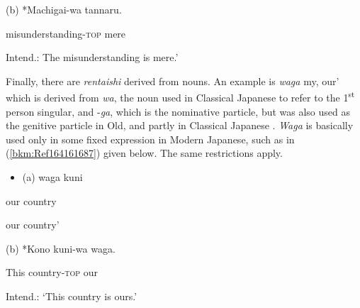 \documentclass[output=paper]{langscibook}
\begin{document}
\begin{styleBeispielCinqueKapitel}
(b) *Machigai-wa tannaru.
\end{styleBeispielCinqueKapitel}

\begin{styleBeispielCinqueKapitel}
misunderstanding-\textsc{top} mere
\end{styleBeispielCinqueKapitel}

\begin{styleBeispielCinqueKapitel}
Intend.: {\textasciigrave}The misunderstanding is mere.’
\end{styleBeispielCinqueKapitel}

Finally, there are \textit{rentaishi} derived from nouns. An example is \textit{waga} {\textasciigrave}my, our’ which is derived from \textit{wa}, the noun used in Classical Japanese to refer to the 1\textsuperscript{st} person singular, and -\textit{ga}, which is the nominative particle, but was also used as the genitive particle in Old, and partly in Classical Japanese \citep{Frellesvig2010}. \textit{Waga} is basically used only in some fixed expression in Modern Japanese, such as in (\ref{bkm:Ref164161687}) given below. The same restrictions apply.

\begin{itemize}
\item \begin{styleBeispielCinqueKapitel}
\label{bkm:Ref164161687}(a) waga kuni
\end{styleBeispielCinqueKapitel}
\end{itemize}
\begin{styleBeispielCinqueKapitel}
our country
\end{styleBeispielCinqueKapitel}

\begin{styleBeispielCinqueKapitel}
{\textasciigrave}our country’
\end{styleBeispielCinqueKapitel}

\begin{styleBeispielCinqueKapitel}
(b) *Kono kuni-wa waga.
\end{styleBeispielCinqueKapitel}

\begin{styleBeispielCinqueKapitel}
This country-\textsc{top} our
\end{styleBeispielCinqueKapitel}

\begin{styleBeispielCinqueKapitel}
Intend.: ‘This country is ours.’
\end{styleBeispielCinqueKapitel}
\end{document}
